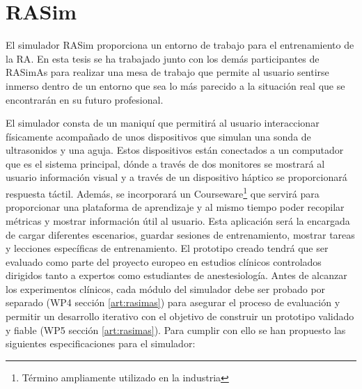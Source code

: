 \section{RASim}
\label{rasim:rasim}
El simulador \ac{RASim} proporciona un entorno de trabajo para el entrenamiento de la \ac{RA}. En esta tesis se ha trabajado junto con los demás participantes de \ac{RASimAs} para realizar una mesa de trabajo que permite al usuario sentirse inmerso dentro de un entorno que sea lo más parecido a la situación real que se encontrarán en su futuro profesional.

El simulador consta de un maniquí que permitirá al usuario interaccionar físicamente acompañado de unos dispositivos que simulan una sonda de ultrasonidos y una aguja. Estos dispositivos están conectados a un computador que es el sistema principal, dónde a través de dos monitores se mostrará al usuario información visual y a través de un dispositivo háptico se proporcionará respuesta táctil. Además, se incorporará un \ac{Courseware}\footnote{Término ampliamente utilizado en la industria } que servirá para proporcionar una plataforma de aprendizaje y al mismo tiempo poder recopilar métricas y mostrar información útil al usuario. Esta aplicación será la encargada de cargar diferentes escenarios, guardar sesiones de entrenamiento, mostrar tareas y lecciones específicas de entrenamiento.
El prototipo creado tendrá que ser evaluado como parte del proyecto europeo en estudios clínicos controlados dirigidos tanto a expertos como estudiantes de anestesiología. Antes de alcanzar los experimentos clínicos, cada módulo del simulador debe ser probado por separado (\ac{WP}4 sección \ref{art:rasimas}) para asegurar el proceso de evaluación y permitir un desarrollo iterativo con el objetivo de construir un prototipo validado y fiable (\ac{WP}5 sección \ref{art:rasimas}). Para cumplir con ello se han propuesto las siguientes especificaciones para el simulador:

